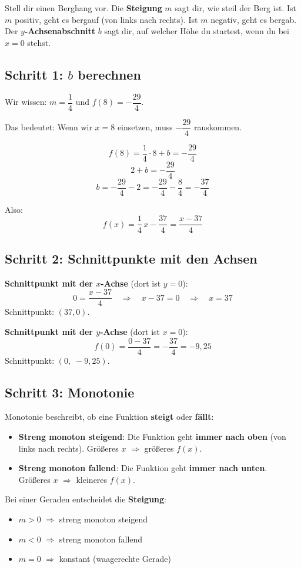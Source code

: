 \documentclass[12pt,a4paper]{article}
\begin{document}
\begin{analogie}
Stell dir einen Berghang vor. Die \textbf{Steigung} $m$ sagt dir, wie steil der Berg ist. Ist $m$ positiv, geht es bergauf (von links nach rechts). Ist $m$ negativ, geht es bergab. Der \textbf{$y$-Achsenabschnitt} $b$ sagt dir, auf welcher H\"ohe du startest, wenn du bei $x=0$ stehst.
\end{analogie}

\subsection{Schritt 1: $b$ berechnen}

Wir wissen: $m = \dfrac{1}{4}$ und $f(8) = -\dfrac{29}{4}$.

Das bedeutet: Wenn wir $x = 8$ einsetzen, muss $-\dfrac{29}{4}$ rauskommen.

\[
  f(8) = \frac{1}{4} \cdot 8 + b = -\frac{29}{4}
\]
\[
  2 + b = -\frac{29}{4}
\]
\[
  b = -\frac{29}{4} - 2 = -\frac{29}{4} - \frac{8}{4} = -\frac{37}{4}
\]

Also:
\[
  \boxed{f(x) = \frac{1}{4}\,x - \frac{37}{4} = \frac{x - 37}{4}}
\]

\subsection{Schritt 2: Schnittpunkte mit den Achsen}

\textbf{Schnittpunkt mit der $x$-Achse} (dort ist $y = 0$):
\[
  0 = \frac{x - 37}{4} \quad\Longrightarrow\quad x - 37 = 0 \quad\Longrightarrow\quad x = 37
\]
Schnittpunkt: $(37, 0)$.

\bigskip

\textbf{Schnittpunkt mit der $y$-Achse} (dort ist $x = 0$):
\[
  f(0) = \frac{0 - 37}{4} = -\frac{37}{4} = -9{,}25
\]
Schnittpunkt: $(0,\; -9{,}25)$.

\subsection{Schritt 3: Monotonie}

\begin{merkbox}[title={Was ist Monotonie?}]
Monotonie beschreibt, ob eine Funktion \textbf{steigt} oder \textbf{f\"allt}:
\begin{itemize}
  \item \textbf{Streng monoton steigend}: Die Funktion geht \textbf{immer nach oben} (von links nach rechts). Gr\"o\ss eres $x$ $\Rightarrow$ gr\"o\ss eres $f(x)$.
  \item \textbf{Streng monoton fallend}: Die Funktion geht \textbf{immer nach unten}. Gr\"o\ss eres $x$ $\Rightarrow$ kleineres $f(x)$.
\end{itemize}
Bei einer Geraden entscheidet die \textbf{Steigung}:
\begin{itemize}
  \item $m > 0$ $\Rightarrow$ streng monoton steigend
  \item $m < 0$ $\Rightarrow$ streng monoton fallend
  \item $m = 0$ $\Rightarrow$ konstant (waagerechte Gerade)
\end{itemize}
\end{merkbox}
\end{document}
